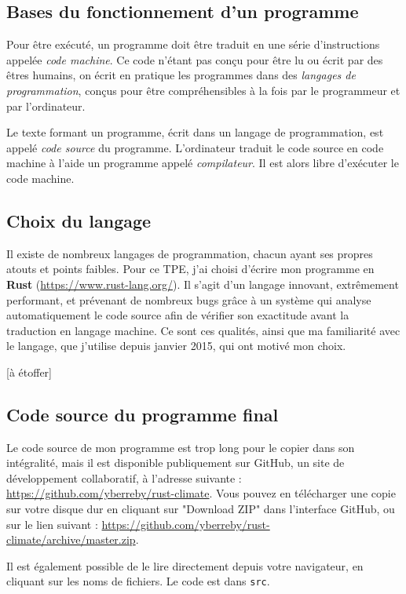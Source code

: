\documentclass[12pt]{article}
\begin{document}
\subsection{Bases du fonctionnement d'un programme}

Pour être exécuté, un programme doit être traduit en une série d'instructions appelée \textit{code machine}. Ce code n'étant pas conçu pour être lu ou écrit par des êtres humains, on écrit en pratique les programmes dans des \textit{langages de programmation}, conçus pour être compréhensibles à la fois par le programmeur et par l'ordinateur.

Le texte formant un programme, écrit dans un langage de programmation, est appelé \textit{code source} du programme. L'ordinateur traduit le code source en code machine à l'aide un programme appelé \textit{compilateur}. Il est alors libre d'exécuter le code machine.

\subsection{Choix du langage}
Il existe de nombreux langages de programmation, chacun ayant ses propres atouts et points faibles. Pour ce TPE, j'ai choisi d'écrire mon programme en \textbf{Rust} (\url{https://www.rust-lang.org/}). Il s'agit d'un langage innovant, extrêmement performant, et prévenant de nombreux bugs grâce à un système qui analyse automatiquement le code source afin de vérifier son exactitude avant la traduction en langage machine. Ce sont ces qualités, ainsi que ma familiarité avec le langage, que j'utilise depuis janvier 2015, qui ont motivé mon choix.

[à étoffer]

\subsection{Code source du programme final}
Le code source de mon programme est trop long pour le copier dans son intégralité, mais il est disponible publiquement sur GitHub, un site de développement collaboratif, à l'adresse suivante : \url{https://github.com/yberreby/rust-climate}. Vous pouvez en télécharger une copie sur votre disque dur en cliquant sur "Download ZIP" dans l'interface GitHub, ou sur le lien suivant : \url{https://github.com/yberreby/rust-climate/archive/master.zip}.

Il est également possible de le lire directement depuis votre navigateur, en cliquant sur les noms de fichiers. Le code est dans \texttt{src}.
\end{document}
